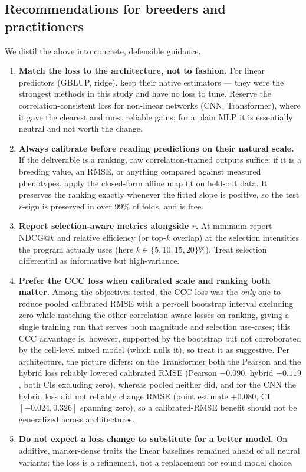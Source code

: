 \subsection{Recommendations for breeders and practitioners}
We distil the above into concrete, defensible guidance.
\begin{enumerate}
\item \textbf{Match the loss to the architecture, not to fashion.} For linear
predictors (GBLUP, ridge), keep their native estimators --- they were the
strongest methods in this study and have no loss to tune. Reserve the
correlation-consistent loss for non-linear networks (CNN, Transformer), where it
gave the clearest and most reliable gains; for a plain MLP it is essentially
neutral and not worth the change.
\item \textbf{Always calibrate before reading predictions on their natural
scale.} If the deliverable is a ranking, raw correlation-trained outputs suffice;
if it is a breeding value, an RMSE, or anything compared against measured
phenotypes, apply the closed-form affine map fit on held-out data. It preserves
the ranking exactly whenever the fitted slope is positive, so the test $r$-sign is
preserved in over $99\%$ of folds, and is free.
\item \textbf{Report selection-aware metrics alongside $r$.} At minimum report
NDCG@$k$ and relative efficiency (or top-$k$ overlap) at the selection intensities
the program actually uses (here $k\in\{5,10,15,20\}\%$). Treat selection
differential as informative but high-variance.
\item \textbf{Prefer the CCC loss when calibrated scale and ranking both matter.}
Among the objectives tested, the CCC loss was the \emph{only} one to reduce pooled
calibrated RMSE with a per-cell bootstrap interval excluding zero while matching the
other correlation-aware losses on ranking, giving a single training run that serves
both magnitude and selection use-cases; this CCC advantage is, however, supported by
the bootstrap but not corroborated by the cell-level mixed model (which nulls it),
so treat it as suggestive. Per architecture, the picture differs: on the Transformer
both the Pearson and the hybrid loss reliably lowered calibrated RMSE (Pearson
$-0.090$, hybrid $-0.119$, both CIs excluding zero), whereas pooled neither did, and
for the CNN the hybrid loss did not reliably change RMSE (point estimate $+0.080$,
CI $[-0.024,0.326]$ spanning zero), so a calibrated-RMSE benefit
should not be generalized across architectures.
\item \textbf{Do not expect a loss change to substitute for a better model.}
On additive, marker-dense traits the linear baselines remained ahead of all
neural variants; the loss is a refinement, not a replacement for sound model
choice.
\end{enumerate}

